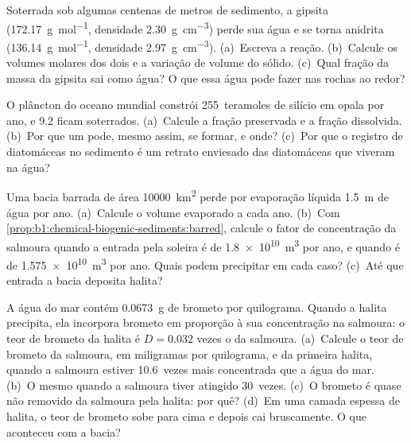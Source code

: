 \begin{exercise}[$\star\star$]\label{exo:b1:chemical-biogenic-sediments:8}
Soterrada sob algumas centenas de metros de sedimento, a gipsita 
(\qty{172.17}{g.mol^{-1}}, densidade \qty{2.30}{g.cm^{-3}}) perde sua água e se torna
anidrita  (\qty{136.14}{g.mol^{-1}}, densidade \qty{2.97}{g.cm^{-3}}). (a)~Escreva a
reação. (b)~Calcule os volumes molares dos dois  e a variação de volume do sólido.
(c)~Qual fração da massa da gipsita sai como água? O que essa água pode fazer nas rochas ao redor?
\end{exercise}

\begin{exercise}[$\star\star$]\label{exo:b1:chemical-biogenic-sediments:9}
O plâncton do oceano mundial constrói 255~teramoles de silício em opala por ano, e 9.2
ficam soterrados. (a)~Calcule a fração preservada e a fração dissolvida. (b)~Por que um
 pode, mesmo assim, se formar, e onde? (c)~Por que o registro de diatomáceas
no sedimento é um retrato enviesado das diatomáceas que viveram na água?
\end{exercise}

\begin{exercise}[$\star\star\star$]\label{exo:b1:chemical-biogenic-sediments:10}
Uma bacia barrada de área \qty{10000}{km^2} perde por evaporação líquida \qty{1.5}{m} de
água por ano. (a)~Calcule o volume evaporado a cada ano. (b)~Com
\cref{prop:b1:chemical-biogenic-sediments:barred}, calcule o fator de concentração da
salmoura quando a entrada pela soleira é de \qty{1.8e10}{m^3} por ano, e quando é de
\qty{1.575e10}{m^3} por ano. Quais  podem precipitar em cada caso? (c)~Até que
entrada a bacia deposita halita?
\end{exercise}

\begin{exercise}[$\star\star\star$]\label{exo:b1:chemical-biogenic-sediments:11}
A água do mar contém \qty{0.0673}{g} de brometo por quilograma. Quando a halita precipita,
ela incorpora brometo em proporção à sua concentração na salmoura: o teor de brometo da
halita é $D = 0.032$ vezes o da salmoura. (a)~Calcule o teor de brometo da salmoura, em
miligramas por quilograma, e da primeira halita, quando a salmoura estiver 10.6~vezes mais
concentrada que a água do mar. (b)~O mesmo quando a salmoura tiver atingido 30~vezes.
(c)~O brometo é quase não removido da salmoura pela halita: por quê? (d)~Em uma camada
espessa de halita, o teor de brometo sobe para cima e depois cai bruscamente. O que
aconteceu com a bacia?
\end{exercise}

